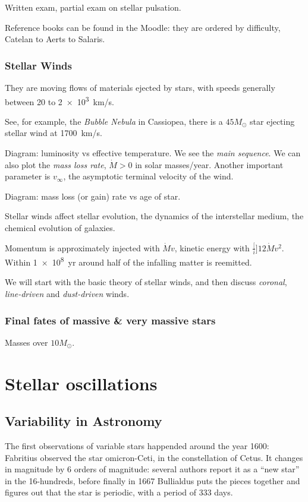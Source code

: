 \documentclass[main.tex]{subfiles}
\begin{document}
Written exam, partial exam on stellar pulsation.

Reference books can be found in the Moodle:
they are ordered by difficulty, Catelan to Aerts to Salaris.

\subsubsection{Stellar Winds}

They are moving flows of materials ejected by stars, with speeds generally between 20 to \SI{2e3}{km/s}.

See, for example, the \emph{Bubble Nebula} in Cassiopea, there is a \(45 M_{\odot}\) star ejecting stellar wind at \SI{1700}{km/s}.

Diagram: luminosity vs effective temperature. We see the \emph{main sequence}.
We can also plot the \emph{mass loss rate}, \(\dot{M}>0 \) in solar masses/year.
Another important parameter is \(v_\infty\), the asymptotic terminal velocity of the wind.

Diagram: mass loss (or gain) rate vs age of star.

Stellar winds affect stellar evolution, the dynamics of the interstellar medium, the chemical evolution of galaxies.

Momentum is approximately injected with \(\dot{M} v\), kinetic energy with \(\frac[i]{1}{2} \dot{M} v^2\).
Within \SI{1e8}{yr} around half of the infalling matter is reemitted.

We will start with the basic theory of stellar winds, and then discuss \emph{coronal}, \emph{line-driven} and \emph{dust-driven} winds.

\subsubsection{Final fates of massive \& very massive stars}

Masses over \(10 M_{\odot}\).

\section{Stellar oscillations}

\subsection{Variability in Astronomy}

The first observations of variable stars happended around the year 1600: Fabritius observed the star omicron-Ceti, in the constellation of Cetus. It changes in magnitude by 6 orders of magnitude: several authors report it as a ``new star'' in the 16-hundreds, before finally in 1667 Bullialdus puts the pieces together and figures out that the star is periodic, with a period of 333 days. 
\end{document}
